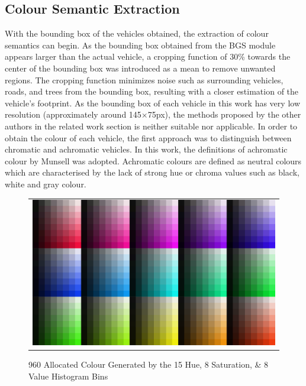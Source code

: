 \subsection{Colour Semantic Extraction }
\label{section:versionOneColorExtract}

With the bounding box of the vehicles obtained, the extraction of colour semantics can begin.
As the bounding box obtained from the BGS module appears larger than the actual vehicle, a cropping function of 30\% towards the center of the bounding box was introduced as a mean to remove unwanted regions.
The cropping function minimizes noise such as surrounding vehicles, roads, and trees from the bounding box, resulting with a closer estimation of the vehicle's footprint.
As the bounding box of each vehicle in this work has very low resolution (approximately around 145$\times$75px), the methods proposed by the other authors in the related work section is neither suitable nor applicable.
In order to obtain the colour of each vehicle, the first approach was to distinguish between chromatic and achromatic vehicles.
In this work, the definitions of achromatic colour by Munsell was adopted.
Achromatic colours are defined as neutral colours which are characterised by the lack of strong hue or chroma values such as black, white and gray colour.

\begin{figure}[htb!]
  \centering
\begin{tabular}{c}
 \includegraphics[width=0.7\linewidth]{image/retrievalOne/all.png} \\
\end{tabular}
	\caption{960 Allocated Colour Generated by the 15 Hue, 8 Saturation, \& 8 Value Histogram Bins} \label{fig:hsvAllocated}
\end{figure}

